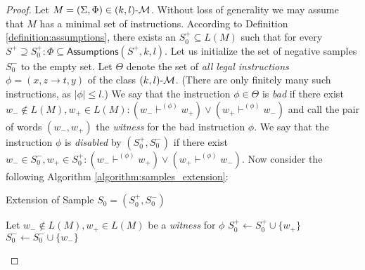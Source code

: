\begin{proof}
Let $M = (\Sigma, \Phi) \in \textup{\sf $(k,l)$-\textup{\sf $\mathcal{M}$}}$. Without loss of generality we may assume that $M$ has a minimal set of instructions. According to Definition \ref{definition:assumptions}, there exists an $S_0^+ \subseteq L(M)$ such that for every $S^+ \supseteq S_0^+: \Phi \subseteq \mathsf{Assumptions}(S^+, k, l)$. Let us initialize the set of negative samples $S_0^-$ to the empty set. Let $\Theta$ denote the set of \emph{all legal instructions} $\phi = (x, z \to t, y)$ of the class $\textup{\sf $(k,l)$-\textup{\sf $\mathcal{M}$}}$. (There are only finitely many such instructions, as $|\phi| \le l$.) We say that the instruction $\phi \in \Theta$ is \emph{bad} if there exist $w_- \notin L(M), w_+ \in L(M): (w_- \vdash^{(\phi)} w_+) \vee (w_+ \vdash^{(\phi)} w_-)$ and call the pair of words $(w_-, w_+)$ the \emph{witness} for the bad instruction $\phi$. We say that the instruction $\phi$ is \emph{disabled} by $(S_0^+, S_0^-)$ if there exist $w_- \in S_0^-, w_+ \in S_0^+: (w_- \vdash^{(\phi)} w_+) \vee (w_+ \vdash^{(\phi)} w_-)$. Now consider the following Algorithm \ref{algorithm:samples_extension}:

\begin{algorithm}\label{algorithm:extend}
\caption{Extension of Sample $S_0 = (S_0^+, S_0^-)$}
\label{algorithm:samples_extension}
\LinesNumbered
{}
{
Let $w_- \notin L(M), w_+ \in L(M)$ be a \emph{witness} for $\phi$\;
$S_0^+ \leftarrow S_0^+ \cup \{ w_+ \}$\;
$S_0^- \leftarrow S_0^- \cup \{ w_- \}$\;
}
\end{algorithm}


\end{proof}

